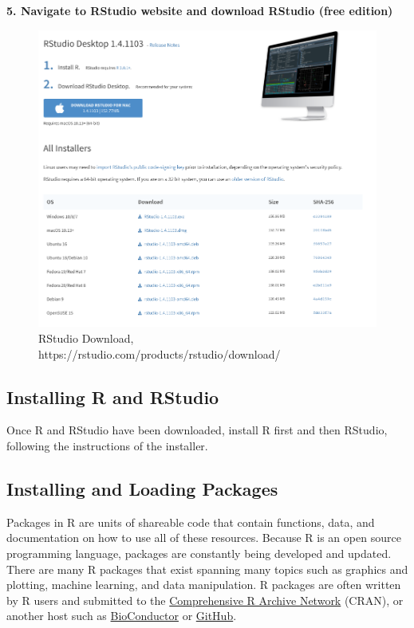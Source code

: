 \documentclass[
]{book}
\begin{document}
\textbf{5. Navigate to RStudio website and download RStudio (free edition)}

\begin{figure}
\includegraphics[width=12.43in]{_book/test1_files/figure-html/rstudio} \caption{RStudio Download, https://rstudio.com/products/rstudio/download/}\label{fig:downloadstudio}
\end{figure}

\hypertarget{installing-r-and-rstudio}{%
\subsection{Installing R and RStudio}\label{installing-r-and-rstudio}}

Once R and RStudio have been downloaded, install R first and then RStudio, following the instructions of the installer.

\hypertarget{installing-and-loading-packages}{%
\subsection{Installing and Loading Packages}\label{installing-and-loading-packages}}

Packages in R are units of shareable code that contain functions, data, and documentation on how to use all of these resources. Because R is an open source programming language, packages are constantly being developed and updated. There are many R packages that exist spanning many topics such as graphics and plotting, machine learning, and data manipulation. R packages are often written by R users and submitted to the \href{https://cran.r-project.org}{Comprehensive R Archive Network} (CRAN), or another host such as \href{https://www.bioconductor.org}{BioConductor} or \href{https://github.com}{GitHub}.
\end{document}
